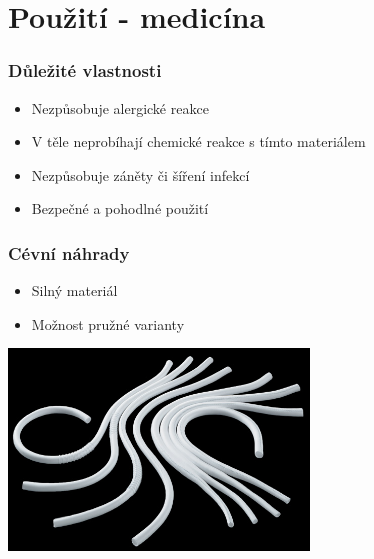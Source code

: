 \section{Použití - medicína}

\begin{frame}
	\frametitle{Důležité vlastnosti}
	\begin{itemize}
		\item Nezpůsobuje alergické reakce
		\item V těle neprobíhají chemické reakce s tímto materiálem
		\item Nezpůsobuje záněty či šíření infekcí
		\item Bezpečné a pohodlné použití
	\end{itemize}
\end{frame}

\begin{frame}
	\frametitle{Cévní náhrady}
	\begin{itemize}
		\item Silný materiál
		\item Možnost pružné varianty
	\end{itemize}
	\includegraphics[width=0.6\textwidth]{nahradni_ceva.jpg}
\end{frame}

